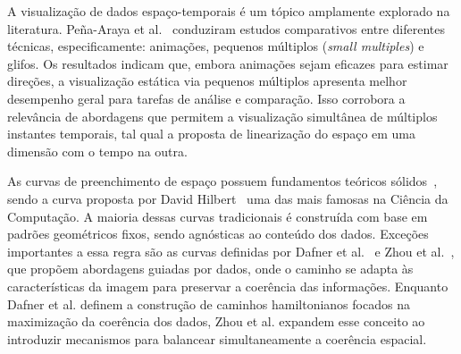\documentclass[12pt]{article}
\begin{document}

A visualização de dados espaço-temporais é um tópico amplamente explorado na literatura. Peña-Araya et al.~\cite{PenaAraya:20}
conduziram estudos comparativos entre diferentes técnicas, especificamente: animações, pequenos múltiplos (\textit{small multiples})
e glifos. Os resultados indicam que, embora animações sejam eficazes para estimar direções, a visualização estática via pequenos
múltiplos apresenta melhor desempenho geral para tarefas de análise e comparação. Isso corrobora a relevância de abordagens que
permitem a visualização simultânea de múltiplos instantes temporais, tal qual a proposta de linearização do espaço em uma dimensão
com o tempo na outra.


As curvas de preenchimento de espaço possuem fundamentos teóricos sólidos~\cite{sagan:94}, sendo a curva proposta por
David Hilbert~\cite{hilbert:1891} uma das mais famosas na Ciência da Computação. A maioria dessas curvas tradicionais é
construída com base em padrões geométricos fixos, sendo agnósticas ao conteúdo dos dados. Exceções importantes a essa regra
são as curvas definidas por Dafner et al.~\cite{dafner:00} e Zhou et al.~\cite{zhou:20}, que propõem abordagens guiadas por dados,
onde o caminho se adapta às características da imagem para preservar a coerência das informações. Enquanto Dafner et al. definem
a construção de caminhos hamiltonianos focados na maximização da coerência dos dados, Zhou et al. expandem esse conceito ao
introduzir mecanismos para balancear simultaneamente a coerência espacial.
\end{document}
